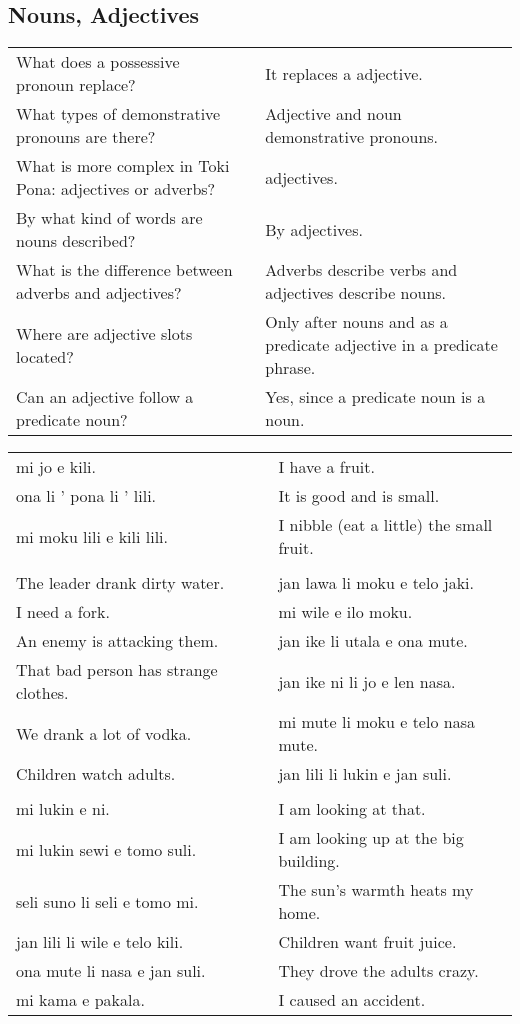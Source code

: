 \subsection*{Nouns, Adjectives} 
\label{'adjectives'}
%
\begin{supertabular}{p{5,5cm}|ll}
What does a possessive pronoun replace? && It replaces a adjective. \\ %
What types of demonstrative pronouns are there? && Adjective and noun demonstrative pronouns.  \\ %
What is more complex in Toki Pona: adjectives or adverbs? && adjectives.  \\ %
By what kind of words are nouns described? && By adjectives.  \\ %
What is the difference between adverbs and adjectives? && Adverbs describe verbs and adjectives describe nouns. \\ %
Where are adjective slots located? && Only after nouns and as a predicate adjective in a predicate phrase. \\ %
Can an adjective follow a predicate noun? && Yes, since a predicate noun is a noun.  \\ %
\end{supertabular} 

\begin{supertabular}{p{5,5cm}|ll}
mi jo e kili.  &&  I have a fruit. \\
ona li ' pona li ' lili. && It is good and is small. \\
mi moku lili e kili lili.  && I nibble (eat a little) the small fruit. \\
 && \\ %
The leader drank dirty water.  && jan lawa li moku e telo jaki. \\ %
I need a fork.  && mi wile e ilo moku. \\ %
An enemy is attacking them. && jan ike li utala e ona mute. \\ %
That bad person has strange clothes.  && jan ike ni li jo e len nasa. \\ %
We drank a lot of vodka.  && mi mute li moku e telo nasa mute. \\ %
Children watch adults.  && jan lili li lukin e jan suli. \\ %
 && \\ %
mi lukin e ni. && I am looking at that. \\ 
mi lukin sewi e tomo suli.  && I am looking up at the big building. \\
seli suno li seli e tomo mi.  && The sun's warmth heats my home.  \\
jan lili li wile e telo kili.  && Children want fruit juice. \\
ona mute li nasa e jan suli.  && They drove the adults crazy. \\
mi kama e pakala. && I caused an accident. \\
\end{supertabular} 

